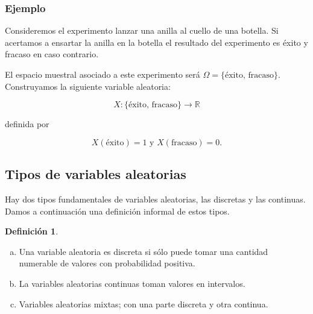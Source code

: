 \documentclass[handout]{beamer}\usepackage[]{graphicx}\usepackage[]{color}
\renewcommand{\emph}[1]{{\color{red}#1}}
\newcommand{\RR}{\mathbb{R}}
\theoremstyle{plain}
\theoremstyle{definition}
\newtheorem{definicion}{Definición}
\begin{document}
\begin{frame}
\frametitle{Ejemplo}
Consideremos el experimento lanzar una anilla al cuello de una botella. Si acertamos a
ensartar la anilla en la botella el resultado del experimento es \emph{éxito} y
\emph{fracaso} en caso contrario. 

El espacio muestral asociado a este experimento será
$\Omega=\{\mbox{éxito, fracaso}\}$. Construyamos la siguiente variable aleatoria:

$$X:\{\mbox{éxito, fracaso}\}\to\RR$$

definida por 

$$X(\mbox{éxito})=1 \mbox{ y } X(\mbox{fracaso})=0.$$

\end{frame}


\subsection{Tipos de variables aleatorias}
\begin{frame}

Hay dos tipos fundamentales de variables aleatorias, las discretas y las continuas.
Damos a continuación una definición informal
de estos tipos.
\begin{definicion}
    \begin{enumerate}[a)]
    \item Una variable aleatoria es \emph{discreta} si sólo puede tomar una cantidad numerable de valores con probabilidad
     positiva.
    \item La variables aleatorias \emph{continuas}  toman  valores en intervalos.
    \item Variables aleatorias \emph{mixtas}; con una parte discreta y otra continua.
\end{enumerate}
\end{definicion}
\end{frame}
\end{document}
